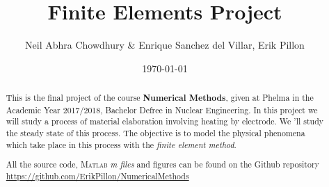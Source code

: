 \documentclass{article}
\begin{document}
\date{\today}
\author{Neil Abhra Chowdhury \& Enrique Sanchez del Villar, Erik Pillon}
\title{Finite Elements Project}
\maketitle
\begin{abstract}
	This is the final project of the course \textbf{Numerical Methods}, given at Phelma in the Academic Year 2017/2018, Bachelor Defree in Nuclear Engineering. In this project we will study a process of material elaboration involving heating by electrode. We 'll study the steady state of this process. The objective is to model the physical phenomena which take place in this process with the \emph{finite element method}.
	
	All the source code, \textsc{Matlab} \textit{m files} and figures can be found on the Github repository \url{https://github.com/ErikPillon/NumericalMethods}
\end{abstract}






\end{document}
